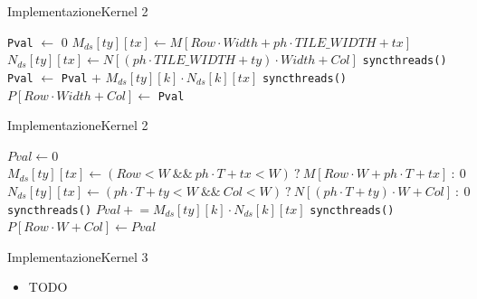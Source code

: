 \documentclass{beamer}
\begin{document}
\begin{frame}{Implementazione}{Kernel 2}
    \begin{algorithm}[H]
        \caption{Tiled Matrix Multiplication Kernel 2}
        \begin{algorithmic}[1]
            \State \texttt{Pval} $\gets$ 0
            \State $M_{ds}[ty][tx] \gets M[Row \cdot Width + ph \cdot TILE\_WIDTH + tx]$
            \State $N_{ds}[ty][tx] \gets N[(ph \cdot TILE\_WIDTH + ty) \cdot Width + Col]$
            \State \texttt{syncthreads()}
            \State \texttt{Pval} $\gets$ \texttt{Pval} $+$ $M_{ds}[ty][k] \cdot N_{ds}[k][tx]$
            \EndFor
            \State \texttt{syncthreads()}
            \EndFor
            \State $P[Row \cdot Width + Col] \gets$ \texttt{Pval}
        \end{algorithmic}
    \end{algorithm}
\end{frame}

\begin{frame}{Implementazione}{Kernel 2}
    \begin{algorithm}[H]
        \scriptsize
        \caption{Tiled Matrix Multiplication Kernel 2 con padding}
        \begin{algorithmic}[1]
            \State $Pval \gets 0$
            \State $M_{ds}[ty][tx] \gets (Row<W~\&\&~ph\cdot T+tx<W)~?~M[Row\cdot W + ph\cdot T + tx]~:~0$
            \State $N_{ds}[ty][tx] \gets (ph\cdot T+ty<W~\&\&~Col<W)~?~N[(ph\cdot T+ty)\cdot W + Col]~:~0$
            \State \texttt{syncthreads()}
            \State $Pval \mathrel{+}= M_{ds}[ty][k] \cdot N_{ds}[k][tx]$
            \EndFor
            \State \texttt{syncthreads()}
            \EndFor
            \State $P[Row\cdot W + Col] \gets Pval$
            \EndIf
        \end{algorithmic}
    \end{algorithm}
\end{frame}

\begin{frame}{Implementazione}{Kernel 3}
    \begin{itemize}
        \item TODO
    \end{itemize}
\end{frame}
\end{document}
